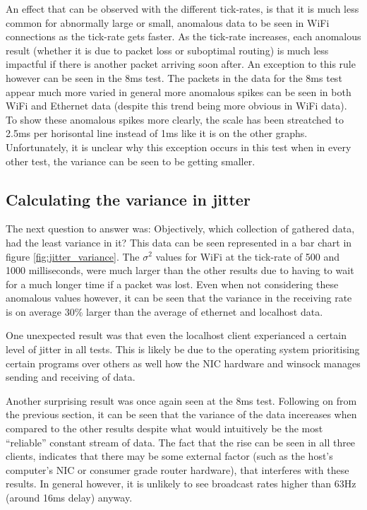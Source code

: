 An effect that can be observed with the different tick-rates, is that it is much less common for abnormally large or small, anomalous data to be seen in WiFi connections as the tick-rate gets faster. As the tick-rate increases, each anomalous result (whether it is due to packet loss or suboptimal routing) is much less impactful if there is another packet arriving soon after. An exception to this rule however can be seen in the 8ms test. The packets in the data for the 8ms test appear much more varied in general more anomalous spikes can be seen in both WiFi and Ethernet data (despite this trend being more obvious in WiFi data). To show these anomalous spikes more clearly, the scale has been streatched to 2.5ms per horisontal line instead of 1ms like it is on the other graphs. Unfortunately, it is unclear why this exception occurs in this test when in every other test, the variance can be seen to be getting smaller.

\newpage



\subsection{Calculating the variance in jitter}\label{sec:variance_results}
The next question to answer was: Objectively, which collection of gathered data, had the least variance in it? This data can be seen represented in a bar chart in figure \ref{fig:jitter_variance}. The $\sigma^2$ values for WiFi at the tick-rate of 500 and 1000 milliseconds, were much larger than the other results due to having to wait for a much longer time if a packet was lost. Even when not considering these anomalous values however, it can be seen that the variance in the receiving rate is on average 30\% larger than the average of ethernet and localhost data.

One unexpected result was that even the localhost client experianced a certain level of jitter in all tests. This is likely be due to the operating system prioritising certain programs over others as well how the NIC hardware and winsock manages sending and receiving of data.

Another surprising result was once again seen at the 8ms test. Following on from the previous section, it can be seen that the variance of the data incereases when compared to the other results despite what would intuitively be the most ``reliable'' constant stream of data. The fact that the rise can be seen in all three clients, indicates that there may be some external factor (such as the host's computer's NIC or consumer grade router hardware), that interferes with these results. In general however, it is unlikely to see broadcast rates higher than 63Hz (around 16ms delay) anyway.

